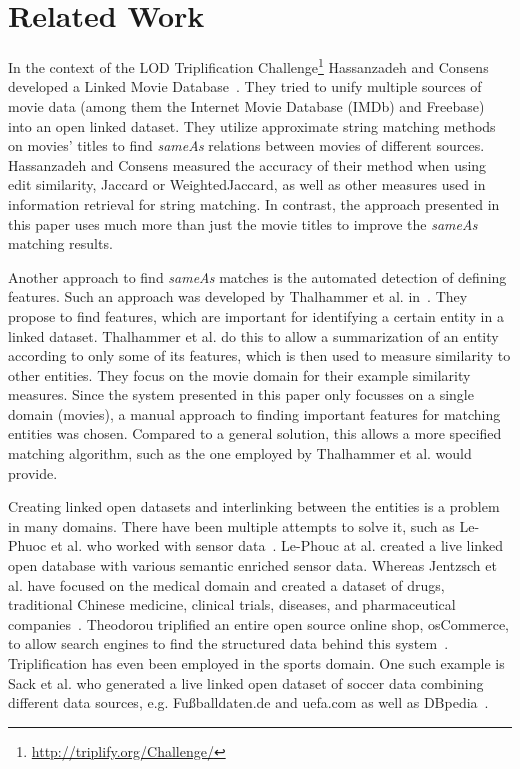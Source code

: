 \section{Related Work}
\label{sec_related_work}

In the context of the LOD Triplification Challenge\footnote{\url{http://triplify.org/Challenge/}} Hassanzadeh and Consens developed a Linked Movie Database~\cite{LMDB}.
They tried to unify multiple sources of movie data (among them the Internet Movie Database (IMDb) and Freebase) into an open linked dataset.
They utilize approximate string matching methods on movies' titles to find \textit{sameAs} relations between movies of different sources.
Hassanzadeh and Consens measured the accuracy of their method when using edit similarity, Jaccard or WeightedJaccard, as well as other measures used in information retrieval for string matching.
In contrast, the approach presented in this paper uses much more than just the movie titles to improve the \textit{sameAs} matching results.

Another approach to find \textit{sameAs} matches is the automated detection of defining features.
Such an approach was developed by Thalhammer et al. in~\cite{MovieSummarization}.
They propose to find features, which are important for identifying a certain entity in a linked dataset.
Thalhammer et al. do this to allow a summarization of an entity according to only some of its features, which is then used to measure similarity to other entities.
They focus on the movie domain for their example similarity measures.
Since the system presented in this paper only focusses on a single domain (movies), a manual approach to finding important features for matching entities was chosen.
Compared to a general solution, this allows a more specified matching algorithm, such as the one employed by Thalhammer et al. would provide.

Creating linked open datasets and interlinking between the entities is a problem in many domains.
There have been multiple attempts to solve it, such as Le-Phuoc et al. who worked with sensor data~\cite{SensorData}.
Le-Phouc at al. created a live linked open database with various semantic enriched sensor data.
Whereas Jentzsch et al. have focused on the medical domain and created a dataset of drugs, traditional Chinese medicine, clinical trials, diseases, and pharmaceutical companies~\cite{openDrugData}.
Theodorou triplified an entire open source online shop, osCommerce, to allow search engines to find the structured data behind this system~\cite{osCommerce}.
Triplification has even been employed in the sports domain.
One such example is Sack et al. who generated a live linked open dataset of soccer data combining different data sources, e.g. Fußballdaten.de and uefa.com as well as DBpedia~\cite{smm}.


